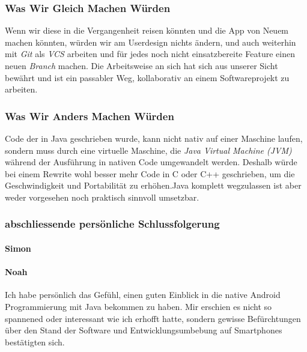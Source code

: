 \documentclass[a4paper,11pt]{article}
\begin{document}
\subsubsection{Was Wir Gleich Machen Würden}
Wenn wir diese in die Vergangenheit reisen könnten und die App von Neuem machen könnten, würden wir am Userdesign nichts ändern, und auch weiterhin mit \textit{Git} als \textit{VCS} arbeiten und für jedes noch nicht einsatzbereite Feature einen neuen \textit{Branch} machen. Die Arbeitsweise an sich hat sich aus unserer Sicht bewährt und ist ein passabler Weg, kollaborativ an einem Softwareprojekt zu arbeiten.
\subsubsection{Was Wir Anders Machen Würden}

Code der in Java geschrieben wurde, kann nicht nativ auf einer Maschine laufen, sondern muss durch eine virtuelle Maschine, die \textit{Java Virtual Machine (JVM)} während der Ausführung in nativen Code umgewandelt werden. Deshalb würde bei einem Rewrite wohl besser mehr Code in C oder C++ geschrieben, um die Geschwindigkeit und Portabilität zu erhöhen.Java komplett wegzulassen ist aber weder vorgesehen noch praktisch sinnvoll umsetzbar.


\subsubsection{abschliessende persönliche Schlussfolgerung}
\paragraph{Simon}
\paragraph{Noah}
Ich habe persönlich das Gefühl, einen guten Einblick in die native Android Programmierung mit Java bekommen zu haben. Mir erschien es nicht so spannened oder interessant wie ich erhofft hatte, sondern gewisse Befürchtungen über den Stand der Software und Entwicklungsumbebung auf Smartphones bestätigten sich.\\
\end{document}
